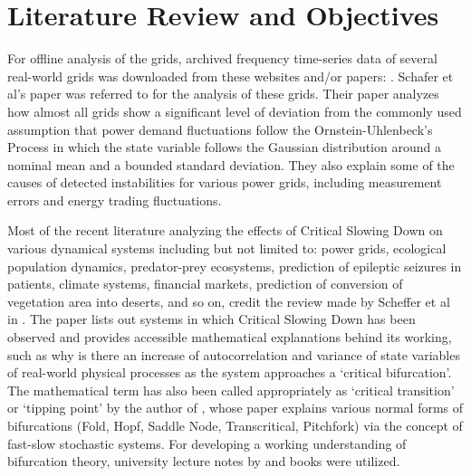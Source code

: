 \section[Literature Review and Objectives]{Literature Review and Objectives}
\label{sec:litt}

For offline analysis of the grids, archived frequency time-series data of several real-world grids was downloaded from these websites and/or papers: \cite{lrydin01, lrydinGithub, tokyo2017, tokyo2020, nordic2018, nordic2019, ce2019, ce2020,  ukNationalGridESOData}. Schafer et al's paper \cite{schafer01} was referred to for the analysis of these grids. Their paper  analyzes how almost all grids show a significant level of deviation from the commonly used assumption that power demand fluctuations follow the Ornstein-Uhlenbeck's Process in which the state variable follows the Gaussian distribution around a nominal mean and a bounded standard deviation. They also explain some of the causes of detected instabilities for various power grids, including measurement errors and energy trading fluctuations.

Most of the recent literature analyzing the effects of Critical Slowing Down on various dynamical systems including but not limited to: power grids, ecological population dynamics, predator-prey ecosystems, prediction of epileptic seizures in patients, climate systems, financial markets, prediction of conversion of vegetation area into deserts, and so on, credit the review made by Scheffer et al in \cite{schefferEarlyWarningSignalsForCriticalTransitions}. The paper lists out systems in which Critical Slowing Down has been observed and provides accessible mathematical explanations behind its working, such as why is there an increase of autocorrelation and variance of state variables of real-world physical processes as the system approaches a `critical bifurcation'. The mathematical term has also been called appropriately as `critical transition' or `tipping point' by the author of \cite{kuehnMathematicalFrameworkForCriticalTransitions}, whose paper explains various normal forms of bifurcations (Fold, Hopf, Saddle Node, Transcritical, Pitchfork) via the concept of fast-slow stochastic systems. For developing a working understanding of bifurcation theory, university lecture notes by \cite{nathanKutzNotesOnBifurcationTheoryAndNormalForms} and books \cite{chenBifurcationsAndChaosInEngineering, mohlerDyanmicsAndControlPartOne} were utilized.  

